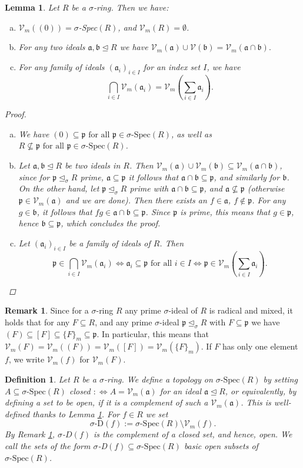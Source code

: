 \documentclass{article}
\def\Vm{\mathcal{V}_m}
\def\V{\mathcal{V}}
\def\a{\mathfrak{a}}
\def\b{\mathfrak{b}}
\def\p{\mathfrak{p}}
\def\s{\sigma}
\def\si{\unlhd_{\sigma}}
\def\sSpec{\sigma\text{-Spec}}
\def\fa{\text{ for all }}
\newenvironment{bew}{\begin{proof}[Proof]}{\end{proof}}
\theoremstyle{plain}
\newtheorem{lem}[Satz]{Lemma}
\newtheorem{defn}[Satz]{Definition}
\theoremstyle{definition}
\newtheorem{rem}[Satz]{Remark}
\begin{document}
\begin{lem}\label{topologywelldef}
Let $R$ be a $\s$-ring. Then we have:
\begin{enumerate}[(a)]
\item $\Vm((0)) = \s$-Spec$(R)$, and $\Vm(R) = \emptyset$.
\item For any two ideals $\a,\b \unlhd R$ we have $\Vm(\a) \cup \V(\b) = \Vm(\a \cap \b).$
\item For any family of ideals $(\a_i)_{i \in I}$ for an index set $I$, we have $$\bigcap_{i \in I} \Vm(\a_i) = \Vm(\sum_{i \in I} \a_i).$$ \label{vmintersectionideals}
\end{enumerate}
\begin{bew}
\begin{enumerate}[(a)]
\item We have $(0) \subseteq \p \fa \p \in \sSpec(R)$, as well as $R \not\subseteq \p \fa \p \in \sSpec(R)$.
\item Let $\a, \b \unlhd R$ be two ideals in $R$. Then $\Vm(\a) \cup \Vm(\b) \subseteq \Vm(\a \cap \b)$, since for $\p \si R$ prime, $\a \subseteq \p$ it follows that $\a \cap \b \subseteq \p$, and similarly for $\b$.
On the other hand, let $\p \si R$ prime with $\a \cap \b \subseteq \p$, and $\a \not\subseteq \p$ (otherwise $\p \in \Vm(\a)$ and we are done). Then there exists an $f \in \a$, $f \notin \p$. 
For any $g \in \b$, it follows that $fg \in \a \cap \b \subseteq \p$. Since $\p$ is prime, this means that $g \in \p$, hence $\b \subseteq \p$, which concludes the proof.
\item Let $(\a_i)_{i \in I}$ be a family  of ideals of $R$. Then $$\p \in \bigcap_{i \in I} \Vm(\a_i) \Leftrightarrow \a_i \subseteq \p \fa i \in I \Leftrightarrow \p \in \Vm(\sum_{i \in I} \a_i).$$
\end{enumerate}
\end{bew}
\end{lem}


\begin{rem}\label{vmsequal}
Since for a $\s$-ring $R$ any prime $\s$-ideal of $R$ is radical and mixed, it holds that for any $F \subseteq R$, and any prime $\s$-ideal $\p \si R$ with $F \subseteq \p$ we have
$(F) \subseteq [F] \subseteq \{ F \}_m \subseteq \p$. In particular, this means that $\Vm(F) = \Vm((F)) = \Vm([F]) = \Vm(\{F\}_m)$. If $F$ has only one element $f$, we write $\Vm(f)$ for $\Vm(F)$.
\end{rem}

\begin{defn}\label{deftop}
Let $R$ be a $\s$-ring. We define a topology on $\sSpec(R)$ by setting $A \subseteq \sSpec(R)$ closed $:\Leftrightarrow A = \Vm(\a)$ for an ideal $\a \unlhd R$, or equivalently,
 by defining a set to be open, if it is a complement of such a $\Vm(\a)$. This is well-defined thanks to Lemma \ref{topologywelldef}.
For $f \in R$ we set $$\s\text{-D}(f):= \sSpec(R) \setminus \Vm(f).$$ By Remark \ref{vmsequal}, $\s$-$D(f)$ is the complement of a closed set, and hence, open. 
We call the sets of the form $\s$-D$(f) \subseteq \sSpec(R)$ basic open subsets of $\sSpec(R)$.
\end{defn}
\end{document}

